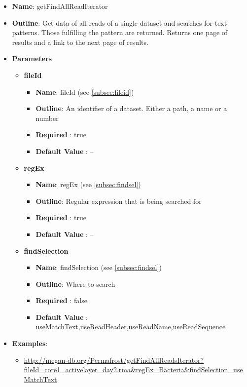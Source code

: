 \documentclass[11pt]{article}
\begin{document}
\begin{itemize}
	\item \textbf{Name}: getFindAllReadIterator
	\item \textbf{Outline}: Get data of all reads of a single dataset and searches for text patterns. Those fulfilling the pattern are returned. Returns one page of results and a link to the next page of results.
	\item \textbf{Parameters}
		\begin{itemize}
			\item \textbf{fileId}		
				\begin{itemize}
					\item \textbf{Name}: fileId (see \ref{subsec:fileid})
					\item \textbf{Outline}: An identifier of a dataset. Either a path, a name or a number
					\item \textbf{Required} : true
					\item \textbf{Default Value} : --
				\end{itemize}
			\item \textbf{regEx}		
				\begin{itemize}
					\item \textbf{Name}: regEx (see \ref{subsec:findsel})
					\item \textbf{Outline}: Regular expression that is being searched for
					\item \textbf{Required} : true
					\item \textbf{Default Value} : --
				\end{itemize}
			\item \textbf{findSelection}		
				\begin{itemize}
					\item \textbf{Name}: findSelection (see \ref{subsec:findsel})
					\item \textbf{Outline}: Where to search
					\item \textbf{Required} : false
					\item \textbf{Default Value} : useMatchText,useReadHeader,useReadName,useReadSequence
				\end{itemize}

		\end{itemize}
	\item \textbf{Examples}:
		\begin{itemize}		
			\item \url{http://megan-db.org/Permafrost/getFindAllReadsIterator?fileId=core1_activelayer_day2.rma&regEx=Bacteria&findSelection=useMatchText}
		\end{itemize}
\end{itemize}
\end{document}
